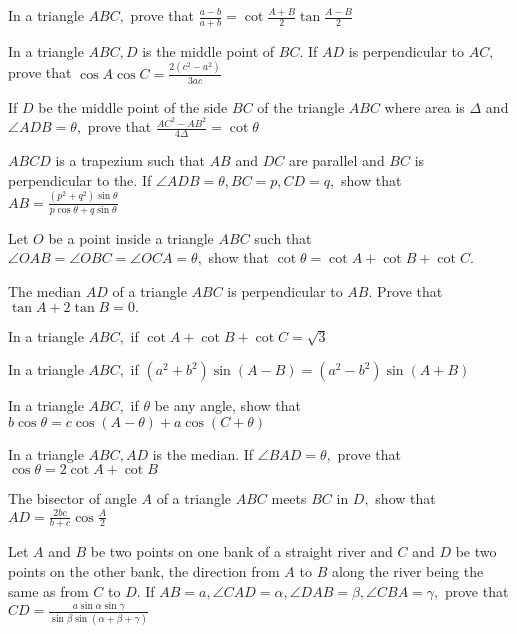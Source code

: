 \item In a triangle $ABC,$ prove that $\frac{a- b}{a + b} = \cot\frac{A + B}{2}\tan\frac{A - B}{2}$

\item In a triangle $ABC, D$ is the middle point of $BC.$ If $AD$ is perpendicular to $AC,$ prove that
    $\cos A\cos C = \frac{2(c^2 - a^2)}{3ac}$

\item If $D$ be the middle point of the side $BC$ of the triangle $ABC$ where area is $\Delta$ and
    $\angle ADB=\theta,$ prove that $\frac{AC^2 - AB^2}{4\Delta} = \cot\theta$

\item $ABCD$ is a trapezium such that $AB$ and $DC$ are parallel and $BC$ is perpendicular to the. If
    $\angle ADB = \theta, BC = p, CD=q,$ show that $AB = \frac{(p^2 + q^2)\sin\theta}{p\cos\theta + q\sin\theta}$

\item Let $O$ be a point inside a triangle $ABC$ such that $\angle OAB = \angle OBC = \angle OCA = \theta,$ show
    that $\cot \theta = \cot A + \cot B + \cot C.$

\item The median $AD$ of a triangle $ABC$ is perpendicular to $AB.$ Prove that $\tan A + 2\tan B = 0.$

\item In a triangle $ABC,$ if $\cot A+ \cot B + \cot C = \sqrt{3}$

\item In a triangle $ABC,$ if $(a^2 + b^2)\sin(A - B) = (a^2 - b^2)\sin(A + B)$

\item In a triangle $ABC,$ if $\theta$ be any angle, show that $b\cos\theta = c\cos(A - \theta) + a\cos(C +
    \theta)$

\item In a triangle $ABC, AD$ is the median. If $\angle BAD = \theta,$ prove that $\cos\theta = 2\cot A + \cot B$

\item The bisector of angle $A$ of a triangle $ABC$ meets $BC$ in $D,$ show that $AD = \frac{2bc}{b +
    c}\cos \frac{A}{2}$

\item Let $A$ and $B$ be two points on one bank of a straight river and $C$ and $D$ be two points on the
    other bank, the direction from $A$ to $B$ along the river being the same as from $C$ to $D.$ If
    $AB = a, \angle CAD = \alpha, \angle DAB = \beta, \angle CBA=\gamma,$ prove that $CD =
    \frac{a\sin\alpha\sin\gamma}{\sin\beta \sin(\alpha + \beta + \gamma)}$

